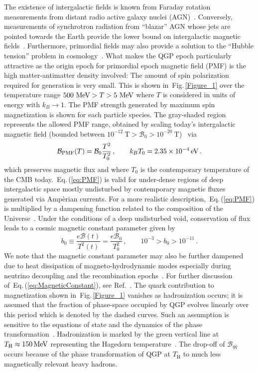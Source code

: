 \documentclass[epjST]{svjour}
\newcommand*{\MeV}{\text{\,MeV}}
\newcommand*{\eV}{\text{\,eV}}
\newcommand{\req}[1]{Eq.\,(\ref{#1})}
\newcommand{\rf}[1]{Fig.\,{\ref{#1}}}
\begin{document}
{\color{blue} The existence of intergalactic fields is known from Faraday rotation measurements from distant radio active galaxy nuclei (AGN)~\cite{Pomakov:2022cem}. Conversely, measurements of synchrotron radiation from ``blazar'' AGN whose jets are pointed towards the Earth provide the lower bound on intergalactic magnetic fields~\cite{Neronov:2010gir}. Furthermore, primordial fields may also provide a solution to the ``Hubble tension'' problem in cosmology~\cite{Jedamzik:2025cax}. What makes the QGP epoch particularly attractive as the origin epoch for primordial epoch magnetic field (PMF) is the high matter-antimatter density involved: The amount of spin polarization required for generation is very small. This is shown in~\rf{Figure_1} over the temperature range \(500\,\MeV>T>5\,\MeV\) where \(T\) is considered in units of energy with \(k_{B}\to 1\). The PMF strength generated by maximum spin magnetization is shown for each particle species. The gray-shaded region represents the allowed PMF range, obtained by scaling today’s intergalactic magnetic field (bounded between \(10^{-12}~\mathrm{T} > \mathcal{B}_{0} > 10^{-20}~\mathrm{T}\))~\cite{Pshirkov:2015tua,Planck:2015zrl,Jedamzik:2018itu} via
\begin{equation}
\label{eq:PMF}
\mathcal{B}_\mathrm{PMF}(T) = \mathcal{B}_{0}\frac{T^{2}}{T_{0}^{2}}\,,\qquad
k_{B}T_{0} = 2.35\times10^{-4}\eV\,.
\end{equation}
which preserves magnetic flux and where \(T_{0}\) is the contemporary temperature of the CMB today.~\req{eq:PMF} is valid for under-dense regions of deep intergalactic space mostly undisturbed by contemporary magnetic fluxes generated via Amp{\`e}rian currents. For a more realistic description,~\req{eq:PMF} is multiplied by a dampening function related to the composition of the Universe~\cite{Banerjee:2004df}. Under the conditions of a deep undisturbed void, conservation of flux leads to a cosmic magnetic constant parameter given by
\begin{equation}
\label{eq:MagneticConstant}
b_{0} \equiv \frac{e\mathcal{B}(t)}{T^{2}(t)}=\frac{e\mathcal{B}_{0}}{T_{0}^{2}}\,,\qquad
10^{-3} > b_{0} > 10^{-11}\,.
\end{equation}
We note that the magnetic constant parameter may also be further dampened due to heat dissipation of magneto-hydrodynamic modes especially during neutrino decoupling and the recombination epochs~\cite{Jedamzik:1996wp}. For further discussion of~\req{eq:MagneticConstant}, see Ref.~\cite{Steinmetz:2023nsc}. The quark contribution to magnetization shown in~\rf{Figure_1} vanishes as hadronization occurs; it is assumed that the fraction of phase-space occupied by QGP evolves linearly over this period which is denoted by the dashed curves. Such an assumption is sensitive to the equations of state and the dynamics of the phase transformation~\cite{Fromerth:2012fe}.} Hadronization is marked by the green vertical line at \(T_\mathrm{H}\approx150\MeV\) {\color{blue}representing the Hagedorn temperature~\cite{Hagedorn:1967dia,Rafelski:2015xej}.} The drop-off of \(\mathcal{B}_{q\bar{q}}\) occurs because of the phase transformation of QGP at \(T_\mathrm{H}\) to much less magnetically relevant heavy hadrons.
\end{document}
